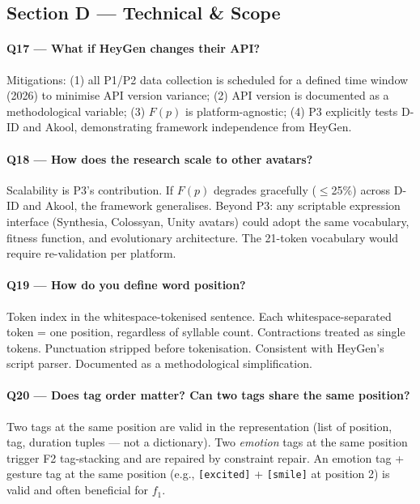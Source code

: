 \documentclass[12pt,a4paper]{article}
\begin{document}
\subsection*{Section D --- Technical \& Scope}

\paragraph{Q17 --- What if HeyGen changes their API?}
Mitigations: (1) all P1/P2 data collection is scheduled for a defined time window (2026) to minimise API version variance; (2) API version is documented as a methodological variable; (3) $F(p)$ is platform-agnostic; (4) P3 explicitly tests D-ID and Akool, demonstrating framework independence from HeyGen.

\paragraph{Q18 --- How does the research scale to other avatars?}
Scalability is P3's contribution. If $F(p)$ degrades gracefully ($\leq$25\%) across D-ID and Akool, the framework generalises. Beyond P3: any scriptable expression interface (Synthesia, Colossyan, Unity avatars) could adopt the same vocabulary, fitness function, and evolutionary architecture. The 21-token vocabulary would require re-validation per platform.

\paragraph{Q19 --- How do you define word position?}
Token index in the whitespace-tokenised sentence. Each whitespace-separated token = one position, regardless of syllable count. Contractions treated as single tokens. Punctuation stripped before tokenisation. Consistent with HeyGen's script parser. Documented as a methodological simplification.

\paragraph{Q20 --- Does tag order matter? Can two tags share the same position?}
Two tags at the same position are valid in the representation (list of position, tag, duration tuples --- not a dictionary). Two \textit{emotion} tags at the same position trigger F2 tag-stacking and are repaired by constraint repair. An emotion tag + gesture tag at the same position (e.g., \texttt{[excited]} + \texttt{[smile]} at position 2) is valid and often beneficial for $f_1$.
\end{document}
